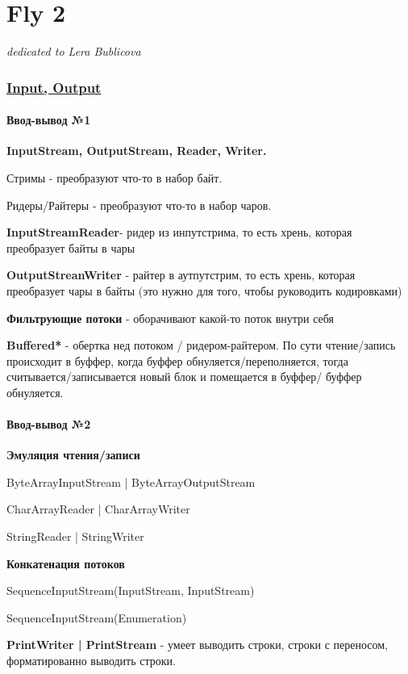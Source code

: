\documentclass{article}
\begin{document}
\part{Fly 2}

\textit{dedicated to Lera Bublicova}

\section{\underline{Input, Output}}

\subsection{Ввод-вывод №1}

\textbf{InputStream, OutputStream, Reader, Writer.}

Стримы - преобразуют что-то в набор байт.

Ридеры/Райтеры - преобразуют что-то в набор чаров.

\textbf{InputStreamReader}- ридер из инпутстрима, то есть хрень, которая преобразует байты в чары

\textbf{OutputStreanWriter} - райтер в аутпутстрим, то есть хрень, которая преобразует чары в байты (это нужно для того, чтобы руководить кодировками)

\textbf{Фильтрующие потоки} - оборачивают какой-то поток внутри себя

\textbf{Buffered*} - обертка нед потоком / ридером-райтером. По сути чтение/запись происходит в буффер, когда буффер обнуляется/переполняется, тогда считывается/записывается новый блок и помещается в буффер/ буффер обнуляется.

\subsection{Ввод-вывод №2}

\textbf{Эмуляция чтения/записи}

ByteArrayInputStream | ByteArrayOutputStream

CharArrayReader | CharArrayWriter

StringReader | StringWriter

\textbf{Конкатенация потоков}

SequenceInputStream(InputStream, InputStream)

SequenceInputStream(Enumeration)

\textbf{PrintWriter | PrintStream} - умеет выводить строки, строки с переносом, форматированно выводить строки.
\end{document}
